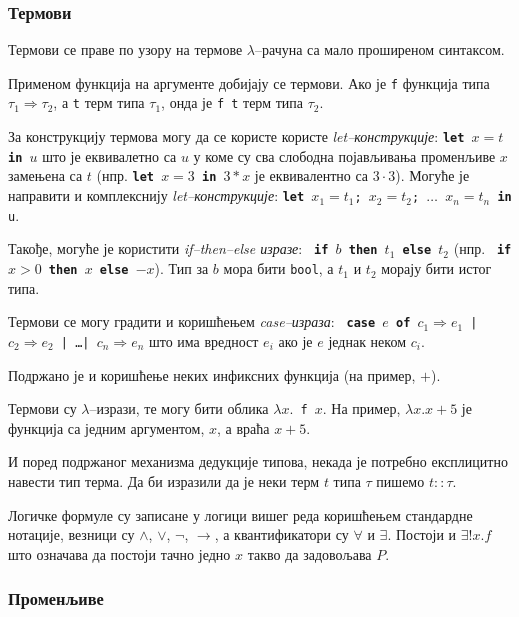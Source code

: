 \subsubsection{Термови}

Термови се праве по узору на термове $\lambda$--рачуна са мало
проширеном синтаксом. 

Применом функција на аргументе добијају се термови. Ако је {\tt f}
функција типа $\tau_1 \Rightarrow \tau_2$, а {\tt t} терм типа
$\tau_1$, онда је {\tt f t} терм типа $\tau_2$.

За конструкцију термова могу да се користе користе
\emph{let--конструкције}: {\tt \textbf{let} $x = t$ \textbf{in} $u$}
што је еквивалетно са $u$ у коме су сва слободна појављивања променљиве
$x$ замењена са $t$ (нпр. {\tt \textbf{let} $x=3$ \textbf{in} $3*x$}
је еквивалентно са $3\cdot 3$). Могуће је направити и комплекснију
\emph{let--конструкције}: {\tt \textbf{let} $x_1 = t_1$; $x_2 = t_2$;
  $\ldots$ $x_n = t_n$ \textbf{in} u}.

Такође, могуће је користити \emph{if--then--else изразе}: {\tt
  \textbf{if} $b$ \textbf{then} $t_1$ \textbf{else} $t_2$} (нпр. {\tt
  \textbf{if} $x > 0$ \textbf{then} $x$ \textbf{else} $-x$}). Тип за
$b$ мора бити {\tt bool}, а $t_1$ и $t_2$ морају бити истог типа.

Термови се могу градити и коришћењем \emph{case--израза}: {\tt
  \textbf{case} $e$ \textbf{of} $c_1 \Rightarrow e_1$ | $c_2
  \Rightarrow e_2$ | \ldots | $c_n \Rightarrow e_n$} што има вредност
$e_i$ ако је $e$ једнак неком $c_i$.

Подржано је и коришћење неких инфиксних функција (на пример, $+$).

Термови су $\lambda$--изрази, те могу бити облика {\tt $\lambda x.$ f
  $x$}. На пример, $\lambda x. x+5$ је функција са једним аргументом,
$x$, а враћа $x+5$. 

И поред подржаног механизма дедукције типова, некада је потребно
експлицитно навести тип терма. Да би изразили да је неки терм $t$ типа
$\tau$ пишемо $t :: \tau$.

Логичке формуле су записане у логици вишег реда коришћењем стандардне
нотације, везници су $\wedge$, $\vee$, $\neg$, $\longrightarrow$, а
квантификатори су $\forall$ и $\exists$. Постоји и $\exists ! x. f$
што означава да постоји тачно једно $x$ такво да задовољава $P$.

\subsubsection{Променљиве}

